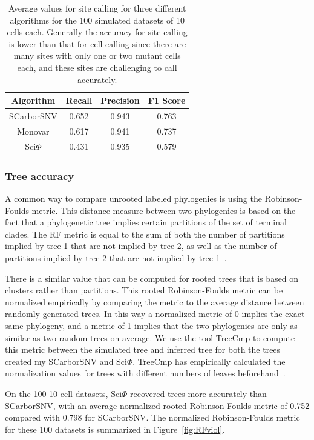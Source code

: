 \documentclass[../../main.tex]{subfiles}
\begin{document}
\begin{table}[h]
    \centering
    \begin{tabular}{||c|c c c||}
        \hline\hline
        Algorithm & Recall & Precision & F1 Score\\
        \hline
        SCarborSNV & 0.652 & 0.943 & 0.763\\
        Monovar & 0.617 & 0.941 & 0.737\\
        Sci$\Phi$ & 0.431 & 0.935 & 0.579 \\
        \hline\hline
    \end{tabular}
    \caption{Average values for site calling for three different algorithms for the 100 simulated datasets of 10 cells each.
    Generally the accuracy for site calling is lower than that for cell calling since there are many sites with only one or two mutant cells each, and these sites are challenging to call accurately.}
    \label{table:site10accuracy1} 
\end{table}

\subsubsection*{Tree accuracy}
A common way to compare unrooted labeled phylogenies is using the Robinson-Foulds metric.
This distance measure between two phylogenies is based on the fact that a phylogenetic tree implies certain partitions of the set of terminal clades.
The RF metric is equal to the sum of both the number of partitions implied by tree 1 that are not implied by tree 2, as well as the number of partitions implied by tree 2 that are not implied by tree 1~\cite{RFmetric}.

There is a similar value that can be computed for rooted trees that is based on clusters rather than partitions.
This rooted Robinson-Foulds metric can be normalized empirically by comparing the metric to the average distance between randomly generated trees.
In this way a normalized metric of 0 implies the exact same phylogeny, and a metric of 1 implies that the two phylogenies are only as similar as two random trees on average.
We use the tool TreeCmp to compute this metric between the simulated tree and inferred tree for both the trees created my SCarborSNV and Sci$\Phi$.
TreeCmp has empirically calculated the normalization values for trees with different numbers of leaves beforehand~\cite{TreeCmp}.

On the 100 10-cell datasets, Sci$\Phi$ recovered trees more accurately than SCarborSNV, with an average normalized rooted Robinson-Foulds metric of 0.752 compared with 0.798 for SCarborSNV.
The normalized Robinson-Foulds metric for these 100 datasets is summarized in Figure~\ref{fig:RFviol}.
\end{document}
